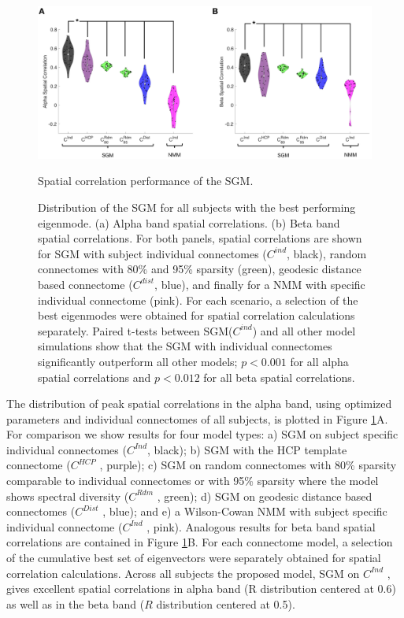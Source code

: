 \begin{figure}[htbp]
    \centering
    \includegraphics[width=\textwidth]{../figures/chapter5/fig7_spatial.png}
    \caption{Spatial correlation performance of the SGM.}
    \caption*{Distribution of the SGM for all subjects with the best performing eigenmode. (a) Alpha band spatial correlations. (b) Beta band spatial correlations. For both panels, spatial correlations are shown for SGM with subject individual connectomes ($C^{ind}$, black), random connectomes with 80\% and 95\% sparsity (green), geodesic distance based connectome ($C^{dist}$, blue), and finally for a NMM with specific individual connectome (pink). For each scenario, a selection of the best eigenmodes were obtained for spatial correlation calculations separately. Paired t-tests between SGM($C^{ind}$) and all other model simulations show that the SGM with individual connectomes significantly outperform all other models; $p < 0.001$ for all alpha spatial correlations and $p < 0.012$ for all beta spatial correlations.}
    \label{fig:spatial}
\end{figure}

The distribution of peak spatial correlations in the alpha band, using
optimized parameters and individual connectomes of all subjects, is
plotted in Figure \ref{fig:spatial}A. For comparison we show results for four
model types: a) SGM on subject specific individual
connectomes ($C^{Ind}$, black); b) SGM with the HCP
template connectome ($C^{HCP}$ , purple); c) SGM on random
connectomes with 80\% sparsity comparable to individual connectomes or
with 95\% sparsity where the model shows spectral diversity
($C^{Rdm}$ , green); d) SGM on geodesic distance based
connectomes ($C^{Dist}$ , blue); and e) a Wilson-Cowan
NMM with subject specific individual connectome
($C^{Ind}$ , pink). Analogous results for beta band spatial
correlations are contained in Figure \ref{fig:spatial}B. For each connectome
model, a selection of the cumulative best set of eigenvectors were
separately obtained for spatial correlation calculations. Across all
subjects the proposed model, SGM on $C^{Ind}$ , gives
excellent spatial correlations in alpha band (R distribution centered at
0.6) as well as in the beta band ($R$ distribution centered at 0.5).

